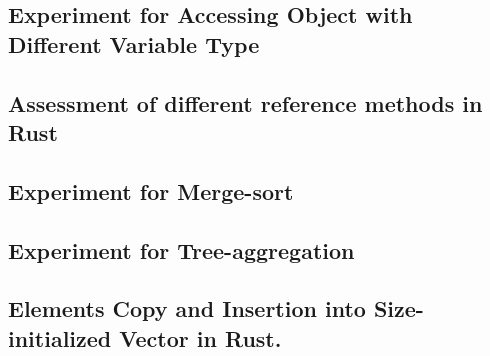 
\subsection{Experiment for Accessing Object with Different Variable Type}
\label{sec:history}

\clearpage

\subsection{Assessment of different reference methods in Rust}
\label{sec:history}

\clearpage

\subsection{Experiment for Merge-sort}
\label{sec:history}

\clearpage

\subsection{Experiment for Tree-aggregation}
\label{sec:history}

\clearpage

\subsection{Elements Copy and Insertion into Size-initialized Vector in Rust.}
\label{sec:history}
